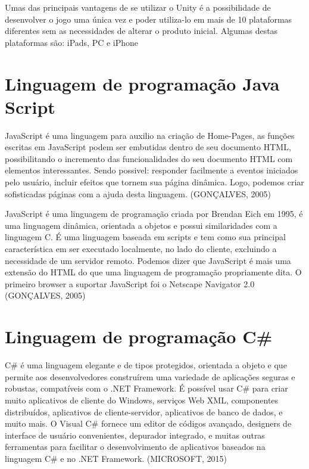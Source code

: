Umas das principais vantagens de se utilizar o Unity é a possibilidade de desenvolver o jogo uma única vez e poder utiliza-lo em mais de 10 plataformas diferentes sem as necessidades de alterar o produto inicial. 
Algumas destas plataformas são: iPads, PC e iPhone

	
\section{Linguagem de programação Java Script}
\label{sec:Linguagem-de-programação-Java-Script}

JavaScript é uma linguagem para auxilio na criação de Home-Pages, as funções escritas em JavaScript podem ser embutidas dentro de seu documento HTML, possibilitando o incremento das funcionalidades do seu documento HTML com elementos interessantes. Sendo possivel: responder facilmente a eventos iniciados pelo usuário, incluir efeitos que tornem sua página dinâmica. Logo, podemos criar sofisticadas páginas com a ajuda desta linguagem. (GONÇALVES, 2005)

JavaScript é uma linguagem de programação criada por Brendan Eich em 1995, é uma linguagem dinâmica, orientada a objetos e possui similaridades com a linguagem C. 
É uma linguagem baseada em scripts e tem como sua principal característica em ser executado localmente, no lado do cliente, excluindo a necessidade de um servidor remoto.
Podemos dizer que JavaScript é mais uma extensão do HTML do que uma linguagem de programação propriamente dita. O primeiro browser a suportar JavaScript foi o Netscape Navigator 2.0 (GONÇALVES, 2005)

\section{Linguagem de programação C\#}
\label{sec:Linguagem-de-programação-Csharp}

C\# é uma linguagem elegante e de tipos protegidos, orientada a objeto e que permite aos desenvolvedores construírem uma variedade de aplicações seguras e robustas, compatíveis com o .NET Framework. É possível usar C\# para criar muito aplicativos de cliente do Windows, serviços Web XML, componentes distribuídos, aplicativos de cliente-servidor, aplicativos de banco de dados, e muito mais. O Visual C\# fornece um editor de códigos avançado, designers de interface de usuário convenientes, depurador integrado, e muitas outras ferramentas para facilitar o desenvolvimento de aplicativos baseados na linguagem C\# e no .NET Framework. (MICROSOFT, 2015)

